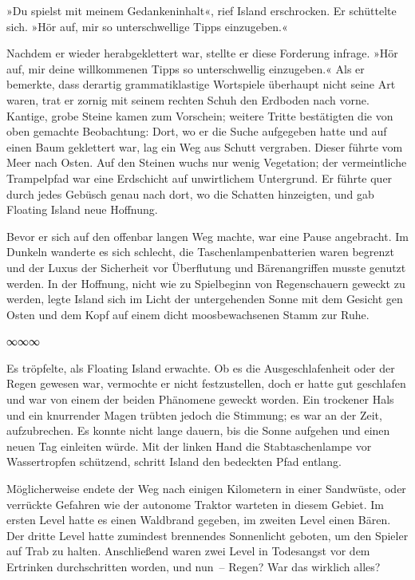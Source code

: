 »Du spielst mit meinem Gedankeninhalt«, rief Island erschrocken. Er schüttelte sich. »Hör auf, mir so unterschwellige Tipps einzugeben.«

Nachdem er wieder herabgeklettert war, stellte er diese Forderung infrage. »Hör auf, mir deine willkommenen Tipps so unterschwellig einzugeben.« Als er bemerkte, dass derartig grammatiklastige Wortspiele überhaupt nicht seine Art waren, trat er zornig mit seinem rechten Schuh den Erdboden nach vorne. Kantige, grobe Steine kamen zum Vorschein; weitere Tritte bestätigten die von oben gemachte Beobachtung: Dort, wo er die Suche aufgegeben hatte und auf einen Baum geklettert war, lag ein Weg aus Schutt vergraben. Dieser führte vom Meer nach Osten. Auf den Steinen wuchs nur wenig Vegetation; der vermeintliche Trampelpfad war eine Erdschicht auf unwirtlichem Untergrund. Er führte quer durch jedes Gebüsch genau nach dort, wo die Schatten hinzeigten, und gab Floating Island neue Hoffnung.

Bevor er sich auf den offenbar langen Weg machte, war eine Pause angebracht. Im Dunkeln wanderte es sich schlecht, die Taschenlampenbatterien waren begrenzt und der Luxus der Sicherheit vor Überflutung und Bärenangriffen musste genutzt werden. In der Hoffnung, nicht wie zu Spielbeginn von Regenschauern geweckt zu werden, legte Island sich im Licht der untergehenden Sonne mit dem Gesicht gen Osten und dem Kopf auf einem dicht moosbewachsenen Stamm zur Ruhe.

\begin{center}
∞∞∞
\end{center}

Es tröpfelte, als Floating Island erwachte. Ob es die Ausgeschlafenheit oder der Regen gewesen war, vermochte er nicht festzustellen, doch er hatte gut geschlafen und war von einem der beiden Phänomene geweckt worden. Ein trockener Hals und ein knurrender Magen trübten jedoch die Stimmung; es war an der Zeit, aufzubrechen. Es konnte nicht lange dauern, bis die Sonne aufgehen und einen neuen Tag einleiten würde. Mit der linken Hand die Stabtaschenlampe vor Wassertropfen schützend, schritt Island den bedeckten Pfad entlang.

Möglicherweise endete der Weg nach einigen Kilometern in einer Sandwüste, oder verrückte Gefahren wie der autonome Traktor warteten in diesem Gebiet. Im ersten Level hatte es einen Waldbrand gegeben, im zweiten Level einen Bären. Der dritte Level hatte zumindest brennendes Sonnenlicht geboten, um den Spieler auf Trab zu halten. Anschließend waren zwei Level in Todesangst vor dem Ertrinken durchschritten worden, und nun~– Regen? War das wirklich alles?

